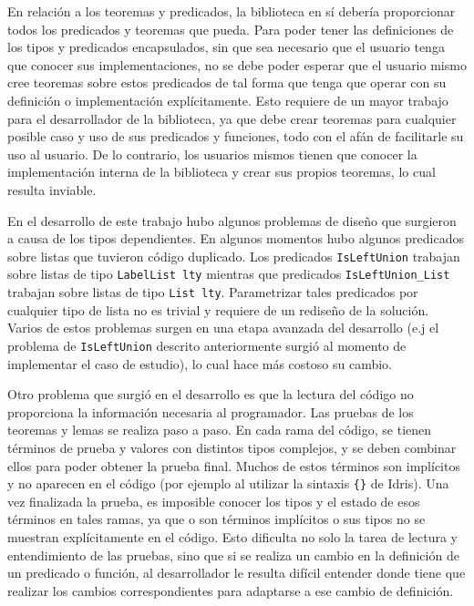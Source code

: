 En relación a los teoremas y predicados, la biblioteca en sí debería proporcionar todos los predicados y teoremas que pueda. Para poder tener las definiciones de los tipos y predicados encapsulados, sin que sea necesario que el usuario tenga que conocer sus implementaciones, no se debe poder esperar que el usuario mismo cree teoremas sobre estos predicados de tal forma que tenga que operar con su definición o implementación explícitamente. Esto requiere de un mayor trabajo para el desarrollador de la biblioteca, ya que debe crear teoremas para cualquier posible caso y uso de sus predicados y funciones, todo con el afán de facilitarle su uso al usuario. De lo contrario, los usuarios mismos tienen que conocer la implementación interna de la biblioteca y crear sus propios teoremas, lo cual resulta inviable.

En el desarrollo de este trabajo hubo algunos problemas de diseño que surgieron a causa de los tipos dependientes. En algunos momentos hubo algunos predicados sobre listas que tuvieron código duplicado. Los predicados \texttt{IsLeftUnion} trabajan sobre listas de tipo \texttt{LabelList lty} mientras que predicados \texttt{IsLeftUnion\_List} trabajan sobre listas de tipo \texttt{List lty}. Parametrizar tales predicados por cualquier tipo de lista no es trivial y requiere de un rediseño de la solución. Varios de estos problemas surgen en una etapa avanzada del desarrollo (e.j el problema de \texttt{IsLeftUnion} descrito anteriormente surgió al momento de implementar el caso de estudio), lo cual hace más costoso su cambio.

Otro problema que surgió en el desarrollo es que la lectura del código no proporciona la información necesaria al programador. Las pruebas de los teoremas y lemas se realiza paso a paso. En cada rama del código, se tienen términos de prueba y valores con distintos tipos complejos, y se deben combinar ellos para poder obtener la prueba final. Muchos de estos términos son implícitos y no aparecen en el código (por ejemplo al utilizar la sintaxis \texttt{\{\}} de Idris). Una vez finalizada la prueba, es imposible conocer los tipos y el estado de esos términos en tales ramas, ya que o son términos implícitos o sus tipos no se muestran explícitamente en el código. Esto dificulta no solo la tarea de lectura y entendimiento de las pruebas, sino que si se realiza un cambio en la definición de un predicado o función, al desarrollador le resulta difícil entender donde tiene que realizar los cambios correspondientes para adaptarse a ese cambio de definición.

